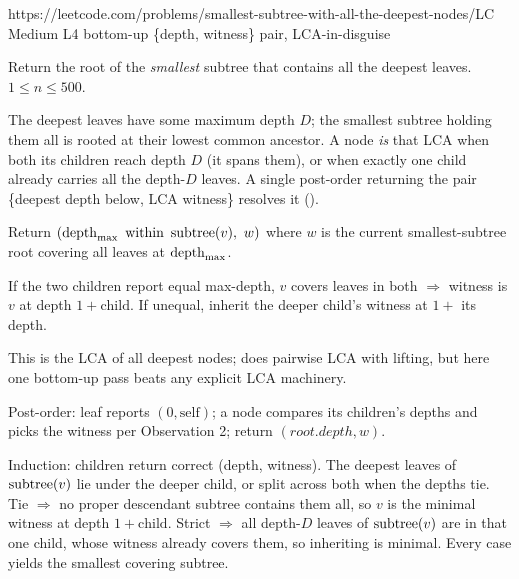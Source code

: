   {https://leetcode.com/problems/smallest-subtree-with-all-the-deepest-nodes/}{LC Medium L4}
  {bottom-up \{depth, witness\} pair, LCA-in-disguise}

\begin{problemstatement}
Return the root of the \emph{smallest} subtree that contains all the deepest
leaves. $1 \le n \le 500$.
\end{problemstatement}

The deepest leaves have some maximum depth $D$; the smallest subtree holding them
all is rooted at their lowest common ancestor. A node \emph{is} that LCA when both
its children reach depth $D$ (it spans them), or when exactly one child already
carries all the depth-$D$ leaves. A single post-order returning the pair
\{deepest depth below, LCA witness\} resolves it ().

\begin{observation}
Return $(\operatorname{depth}_{\max}\text{ within }\operatorname{subtree}(v),\ w)$ where $w$ is the current
smallest-subtree root covering all leaves at $\operatorname{depth}_{\max}$.
\end{observation}
\begin{observation}
If the two children report equal max-depth, $v$ covers leaves in both $\Rightarrow$
witness is $v$ at depth $1+\text{child}$. If unequal, inherit the deeper child's
witness at $1+$ its depth.
\end{observation}
\begin{observation}
This is the LCA of all deepest nodes;  does pairwise LCA with lifting,
but here one bottom-up pass beats any explicit LCA machinery.
\end{observation}

Post-order: leaf reports $(0,\text{self})$; a node compares its children's depths
and picks the witness per Observation 2; return $(\mathit{root}.depth, w)$.

\begin{proofbox}
Induction: children return correct (depth, witness). The deepest leaves of
$\operatorname{subtree}(v)$ lie under the deeper child, or split across both when the depths tie.
Tie $\Rightarrow$ no proper descendant subtree contains them all, so $v$ is the
minimal witness at depth $1+\text{child}$. Strict $\Rightarrow$ all depth-$D$
leaves of $\operatorname{subtree}(v)$ are in that one child, whose witness already covers them,
so inheriting is minimal. Every case yields the smallest covering subtree.
\end{proofbox}

